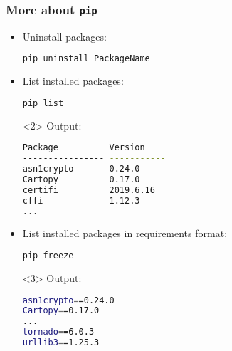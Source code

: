 \begin{frame}[t, fragile]
\frametitle{More about \texttt{pip}}


\begin{itemize}
\item<1-> Uninstall packages:                   
\begin{lstlisting}[language=bash]
pip uninstall PackageName
\end{lstlisting}
\item<2->List installed packages:
\begin{lstlisting}[language=bash]
pip list
\end{lstlisting}

\begin{onlyenv}<2>
Output:
\tiny
\begin{lstlisting}[language=bash]
Package          Version    
---------------- -----------
asn1crypto       0.24.0     
Cartopy          0.17.0     
certifi          2019.6.16  
cffi             1.12.3    
...
\end{lstlisting}
\end{onlyenv}


\item<3-> List installed packages in requirements format:
\begin{lstlisting}[language=bash]
pip freeze
\end{lstlisting}

\begin{onlyenv}<3>
Output:
\tiny
\begin{lstlisting}[language=bash]
asn1crypto==0.24.0
Cartopy==0.17.0
...
tornado==6.0.3
urllib3==1.25.3
\end{lstlisting}
\end{onlyenv}
\end{itemize}
\end{frame}



